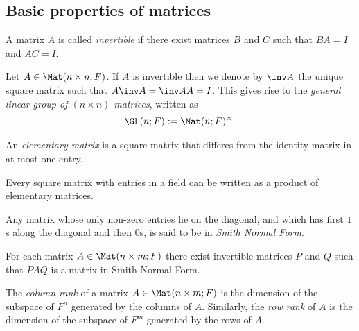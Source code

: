 \documentclass{article}
\begin{document}
\subsection{Basic properties of matrices}

\begin{definition}
    A matrix $A$ is called \emph{invertible} if there exist matrices $B$ and $C$
    such that $BA=I$ and $AC=I$.
\end{definition}

\begin{definition}
    Let $A\in\Mat(n\times n;F)$. If $A$ is invertible then we denote by $\inv A$
    the unique square matrix such that $A\inv A=\inv AA=I$. This gives rise to the
    \emph{general linear group of $(n\times n)$-matrices}, written as
    \begin{align*}
        \GL(n;F) := \Mat(n;F)^\times.
    \end{align*}
\end{definition}

\begin{definition}
    An \emph{elementary matrix} is a square matrix that differes from the identity
    matrix in at most one entry.
\end{definition}

\begin{theorem}[Notes 2.2.3]
    Every square matrix with entries in a field can be written as a product of
    elementary matrices.
\end{theorem}

\begin{definition}
    Any matrix whose only non-zero entries lie on the diagonal, and which has
    first $1$s along the diagonal and then $0$s, is said to be in \emph{Smith Normal Form}.
\end{definition}

\begin{theorem}[Notes 2.2.5]
    For each matrix $A\in\Mat(n\times m;F)$ there exist invertible matrices $P$
    and $Q$ such that $PAQ$ is a matrix in Smith Normal Form.
\end{theorem}

\begin{definition}
    The \emph{column rank} of a matrix $A\in\Mat(n\times m;F)$ is the dimension of
    the subspace of $F^n$ generated by the columns of $A$. Similarly, the \emph{row
        rank} of $A$ is the dimension of the subspace of $F^m$ generated by the rows
    of $A$.
\end{definition}
\end{document}
